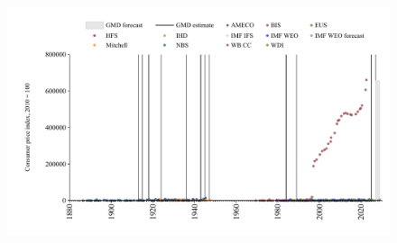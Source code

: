 \documentclass[12pt,a4paper,landscape]{article}
\begin{document}
\begin{adjustbox}{max totalsize={\paperwidth}{\paperheight},center}
\begin{minipage}[t][\textheight][t]{\textwidth}
\begin{table}[H]
\begin{tabular}{|l|l|l|}
\hline
\end{tabular}
\end{table}
\begin{figure}[H]
\centering
\includegraphics[width=\textwidth,height=0.6\textheight,keepaspectratio]{graphs/BGR_CPI.pdf}
\end{figure}
\end{minipage}
\end{adjustbox}
\end{document}
